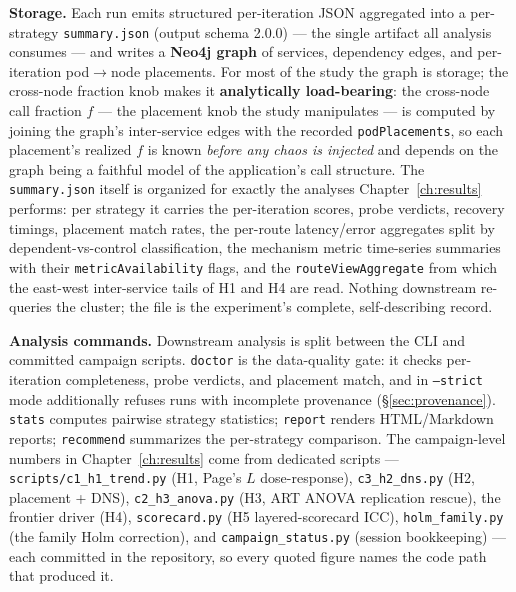\textbf{Storage.} Each run emits structured per-iteration JSON aggregated into a
per-strategy \texttt{summary.json} (output schema 2.0.0) --- the single artifact all
analysis consumes --- and writes a \textbf{Neo4j graph} of services, dependency
edges, and per-iteration pod$\rightarrow$node placements. For most of the study the
graph is storage; the cross-node fraction knob makes it \textbf{analytically
load-bearing}: the cross-node call fraction $f$ --- the placement knob the study
manipulates --- is computed by joining the graph's inter-service edges with the
recorded \texttt{podPlacements}, so each placement's realized $f$ is known
\emph{before any chaos is injected} and depends on the graph being a faithful
model of the application's call structure. The \texttt{summary.json}
itself is organized for exactly the analyses Chapter~\ref{ch:results} performs: per
strategy it carries the per-iteration scores, probe verdicts, recovery
timings, placement match rates, the per-route latency/error aggregates
split by dependent-vs-control classification, the mechanism metric
time-series summaries with their \texttt{metricAvailability} flags, and the
\texttt{routeViewAggregate} from which the east-west inter-service tails of H1
and H4 are read. Nothing downstream re-queries the cluster; the file is the
experiment's complete, self-describing record.

\textbf{Analysis commands.} Downstream analysis is split between the CLI and
committed campaign scripts. \texttt{doctor} is the data-quality gate: it checks
per-iteration completeness, probe verdicts, and placement match, and in
\texttt{--strict} mode additionally refuses runs with incomplete provenance (\S\ref{sec:provenance}).
\texttt{stats} computes pairwise strategy statistics; \texttt{report} renders
HTML/Markdown reports; \texttt{recommend} summarizes the per-strategy comparison.
The campaign-level numbers in Chapter~\ref{ch:results} come from dedicated scripts ---
\texttt{scripts/c1\_h1\_trend.py} (H1, Page's $L$ dose-response),
\texttt{c3\_h2\_dns.py} (H2, placement + DNS), \texttt{c2\_h3\_anova.py} (H3, ART
ANOVA replication rescue), the frontier driver (H4),
\texttt{scorecard.py} (H5 layered-scorecard ICC), \texttt{holm\_family.py} (the
family Holm correction), and \texttt{campaign\_status.py} (session bookkeeping)
--- each committed in the
repository, so every quoted figure names the code path that produced it.


